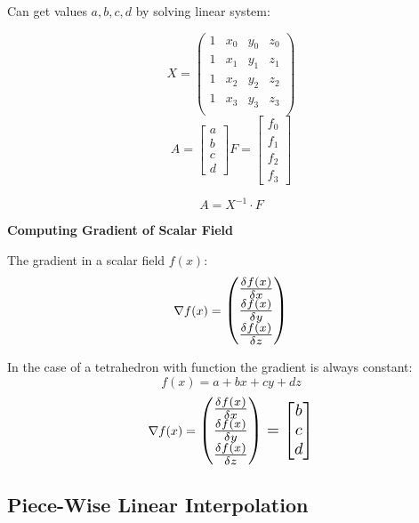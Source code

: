 Can get values $a, b, c, d$ by solving linear system:

$$X = \begin{pmatrix}
        1 & x_0 & y_0 & z_0 \\
        1 & x_1 & y_1 & z_1 \\
        1 & x_2 & y_2 & z_2 \\
        1 & x_3 & y_3 & z_3 \\
    \end{pmatrix}$$
$$A = \begin{bmatrix}
        a \\ b \\ c \\ d
    \end{bmatrix} F = \begin{bmatrix}
        f_0 \\ f_1 \\ f_2 \\ f_3
    \end{bmatrix}$$

$$A = X^{-1} \cdot F$$

\textbf{Computing Gradient of Scalar Field}

The gradient in a scalar field $f(x)$:
$$\nabla f(x) = \Scale[1.3]{\begin{pmatrix}
            \frac{\delta f(x)}{\delta x} \\
            \frac{\delta f(x)}{\delta y} \\
            \frac{\delta f(x)}{\delta z} \\
        \end{pmatrix}}$$

In the case of a tetrahedron with function the gradient is always constant:
$$f(x) = a + bx + cy + dz$$
$$\nabla f(x) = \Scale[1.3]{\begin{pmatrix}
            \frac{\delta f(x)}{\delta x} \\
            \frac{\delta f(x)}{\delta y} \\
            \frac{\delta f(x)}{\delta z} \\
        \end{pmatrix} = \begin{bmatrix}
            b \\ c \\ d
        \end{bmatrix}}$$

\subsection{Piece-Wise Linear Interpolation}

